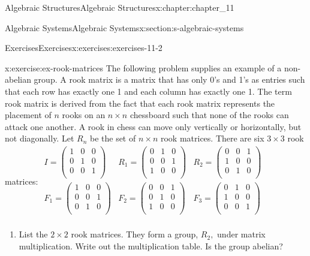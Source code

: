 \documentclass[oneside,10pt,]{book}
\numberwithin{equation}{section}
\begin{document}
\begin{chapterptx}{Algebraic Structures}{}{Algebraic Structures}{}{}{x:chapter:chapter_11}
\begin{sectionptx}{Algebraic Systems}{}{Algebraic Systems}{}{}{x:section:s-algebraic-systems}
\begin{exercises-subsection}{Exercises}{}{Exercises}{}{}{x:exercises:exercises-11-2}
\begin{divisionexercise}{5}{}{}{x:exercise:ex-rook-matrices}
The following problem supplies an example of a non-abelian group. A rook matrix is a matrix that has only 0's and 1's as entries such that each row has exactly one 1 and each column has exactly one 1. The term rook matrix is derived from the fact that each rook matrix represents the placement of \(n\) rooks on an \(n\times n\) chessboard such that none of the rooks can attack one another. A rook in chess can move only vertically or horizontally, but not diagonally. Let \(R_n\) be the set of \(n\times n\) rook matrices. There are six \(3\times 3\) rook matrices: \(\begin{array}{ccc}
I=\left(
\begin{array}{ccc}
1 & 0 & 0 \\
0 & 1 & 0 \\
0 & 0 & 1 \\
\end{array}
\right) & R_1=\left(
\begin{array}{ccc}
0 & 1 & 0 \\
0 & 0 & 1 \\
1 & 0 & 0 \\
\end{array}
\right) & R_2=\left(
\begin{array}{ccc}
0 & 0 & 1 \\
1 & 0 & 0 \\
0 & 1 & 0 \\
\end{array}
\right) \\
F_1=\left(
\begin{array}{ccc}
1 & 0 & 0 \\
0 & 0 & 1 \\
0 & 1 & 0 \\
\end{array}
\right) & F_2=\left(
\begin{array}{ccc}
0 & 0 & 1 \\
0 & 1 & 0 \\
1 & 0 & 0 \\
\end{array}
\right) & F_3=\left(
\begin{array}{ccc}
0 & 1 & 0 \\
1 & 0 & 0 \\
0 & 0 & 1 \\
\end{array}
\right) \\
\end{array}\)%
\begin{enumerate}[label=(\alph*)]
\item{}List the \(2\times 2\) rook matrices. They form a group, \(R_2,\) under matrix multiplication. Write out the multiplication table. Is the group abelian?%

\end{enumerate}
\end{divisionexercise}
\end{exercises-subsection}
\end{sectionptx}
\end{chapterptx}
\end{document}
